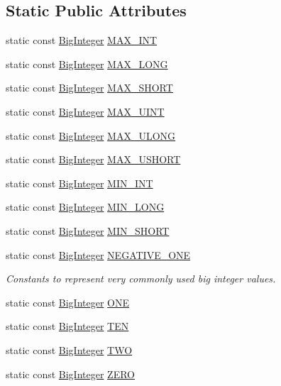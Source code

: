 \subsection*{Static Public Attributes}
\begin{DoxyCompactItemize}
\item 
static const \mbox{\hyperlink{classBigInteger}{Big\+Integer}} \mbox{\hyperlink{classBigInteger_aabf0cd40063eb05e429aaa0da01ab591}{M\+A\+X\+\_\+\+I\+NT}}
\item 
static const \mbox{\hyperlink{classBigInteger}{Big\+Integer}} \mbox{\hyperlink{classBigInteger_a95806eb2e6c271c43e2a9db1f4f3997c}{M\+A\+X\+\_\+\+L\+O\+NG}}
\item 
static const \mbox{\hyperlink{classBigInteger}{Big\+Integer}} \mbox{\hyperlink{classBigInteger_abe2fe880336a857712e05463c2c68545}{M\+A\+X\+\_\+\+S\+H\+O\+RT}}
\item 
static const \mbox{\hyperlink{classBigInteger}{Big\+Integer}} \mbox{\hyperlink{classBigInteger_a2464455af327c0488980c476b686b5c9}{M\+A\+X\+\_\+\+U\+I\+NT}}
\item 
static const \mbox{\hyperlink{classBigInteger}{Big\+Integer}} \mbox{\hyperlink{classBigInteger_a1525fe2273cf30005e8938447a801203}{M\+A\+X\+\_\+\+U\+L\+O\+NG}}
\item 
static const \mbox{\hyperlink{classBigInteger}{Big\+Integer}} \mbox{\hyperlink{classBigInteger_af8946806da52f6cb9107598aa1466a62}{M\+A\+X\+\_\+\+U\+S\+H\+O\+RT}}
\item 
static const \mbox{\hyperlink{classBigInteger}{Big\+Integer}} \mbox{\hyperlink{classBigInteger_a942edd5df7cc33ed3e0531d116c53280}{M\+I\+N\+\_\+\+I\+NT}}
\item 
static const \mbox{\hyperlink{classBigInteger}{Big\+Integer}} \mbox{\hyperlink{classBigInteger_a96aca2cbd95bd16afa004de0cb186845}{M\+I\+N\+\_\+\+L\+O\+NG}}
\item 
static const \mbox{\hyperlink{classBigInteger}{Big\+Integer}} \mbox{\hyperlink{classBigInteger_a1be27840d68d9b74755750de3354609b}{M\+I\+N\+\_\+\+S\+H\+O\+RT}}
\item 
static const \mbox{\hyperlink{classBigInteger}{Big\+Integer}} \mbox{\hyperlink{classBigInteger_a54218bb3532edd5532bf0a3b9442b24b}{N\+E\+G\+A\+T\+I\+V\+E\+\_\+\+O\+NE}}
\begin{DoxyCompactList}\small\item\em Constants to represent very commonly used big integer values. \end{DoxyCompactList}\item 
static const \mbox{\hyperlink{classBigInteger}{Big\+Integer}} \mbox{\hyperlink{classBigInteger_ab4699c19ec258ec72040ec18a7091282}{O\+NE}}
\item 
static const \mbox{\hyperlink{classBigInteger}{Big\+Integer}} \mbox{\hyperlink{classBigInteger_a4ba3620629ec7cd6672198f07ca23a39}{T\+EN}}
\item 
static const \mbox{\hyperlink{classBigInteger}{Big\+Integer}} \mbox{\hyperlink{classBigInteger_ac39750ccb95f4daaf9fc095f5cdac33d}{T\+WO}}
\item 
static const \mbox{\hyperlink{classBigInteger}{Big\+Integer}} \mbox{\hyperlink{classBigInteger_a9ffc8471ab0e5bfe12128dca249d965b}{Z\+E\+RO}}
\end{DoxyCompactItemize}

